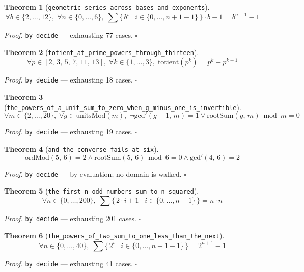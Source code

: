 \documentclass[11pt]{article}
\newtheorem{theorem}{Theorem}[section]
\begin{document}
\begin{theorem}[\texttt{geometric\_series\_across\_bases\_and\_exponents}]
\[ \forall b \in \{2,\dots,12\},\; \forall n \in \{0,\dots,6\},\; \sum \{\, b^{i} \mid i \in \{0,\dots,n + 1-1\} \,\} \cdot b - 1 = b^{n + 1} - 1 \]
\end{theorem}
\noindent\emph{Proof.} \texttt{by decide} --- exhausting 77 cases. \hfill$\square$

\begin{theorem}[\texttt{totient\_at\_prime\_powers\_through\_thirteen}]
\[ \forall p \in [2,\,3,\,5,\,7,\,11,\,13],\; \forall k \in \{1,\dots,3\},\; \mathrm{totient}\mathopen{}\left(p^{k}\right) = p^{k} - p^{k - 1} \]
\end{theorem}
\noindent\emph{Proof.} \texttt{by decide} --- exhausting 18 cases. \hfill$\square$

\begin{theorem}[\texttt{the\_powers\_of\_a\_unit\_sum\_to\_zero\_when\_g\_minus\_one\_is\_invertible}]
\[ \forall m \in \{2,\dots,20\},\; \forall g \in \mathrm{unitsMod}\mathopen{}\left(m\right),\; \lnot \mathrm{gcd'}\mathopen{}\left(g - 1,\,m\right) = 1 \lor \mathrm{rootSum}\mathopen{}\left(g,\,m\right) \bmod m = 0 \]
\end{theorem}
\noindent\emph{Proof.} \texttt{by decide} --- exhausting 19 cases. \hfill$\square$

\begin{theorem}[\texttt{and\_the\_converse\_fails\_at\_six}]
\[ \mathrm{ordMod}\mathopen{}\left(5,\,6\right) = 2 \land \mathrm{rootSum}\mathopen{}\left(5,\,6\right) \bmod 6 = 0 \land \mathrm{gcd'}\mathopen{}\left(4,\,6\right) = 2 \]
\end{theorem}
\noindent\emph{Proof.} \texttt{by decide} --- by evaluation; no domain is walked. \hfill$\square$

\begin{theorem}[\texttt{the\_first\_n\_odd\_numbers\_sum\_to\_n\_squared}]
\[ \forall n \in \{0,\dots,200\},\; \sum \{\, 2 \cdot i + 1 \mid i \in \{0,\dots,n-1\} \,\} = n \cdot n \]
\end{theorem}
\noindent\emph{Proof.} \texttt{by decide} --- exhausting 201 cases. \hfill$\square$

\begin{theorem}[\texttt{the\_powers\_of\_two\_sum\_to\_one\_less\_than\_the\_next}]
\[ \forall n \in \{0,\dots,40\},\; \sum \{\, 2^{i} \mid i \in \{0,\dots,n + 1-1\} \,\} = 2^{n + 1} - 1 \]
\end{theorem}
\noindent\emph{Proof.} \texttt{by decide} --- exhausting 41 cases. \hfill$\square$
\end{document}
